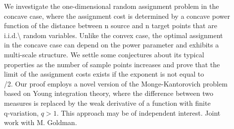 \mypage
{}
\begin{myabstract}
We investigate the one-dimensional random assignment problem in the\\\relax
concave case, where the assignment cost is determined by a concave power\\\relax
function of the distance between n source and n target points that are\\\relax
i.i.d.\textbackslash{} random variables. Unlike the convex case, the optimal assignment\\\relax
in the concave case can depend on the power parameter and exhibits a\\\relax
multi-scale structure. We settle some conjectures about its typical\\\relax
properties as the number of sample points increases and prove that the\\\relax
limit of the assignment costs exists if the exponent is not equal to\\/2. Our proof employs a novel version of the Monge-Kantorovich problem\\\relax
based on Young integration theory, where the difference between two\\\relax
measures is replaced by the weak derivative of a function with finite\\\relax
q-variation, \protect $q>1$. This approach may be of independent interest. Joint\\\relax
work with M. Goldman.
\end{myabstract}

